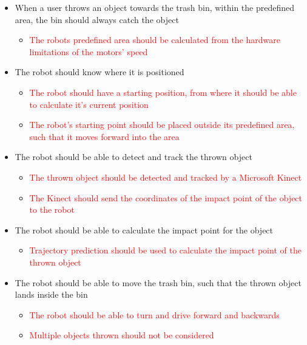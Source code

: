 \begin{itemize}
\item When a user throws an object towards the trash bin, within the predefined area, the bin should always catch the object
\begin{itemize}
\item \textcolor{red}{The robots predefined area should be calculated from the hardware limitations of the motors’ speed}
\end{itemize}
\item The robot should know where it is positioned
\begin{itemize}
\item \textcolor{red}{The robot should have a starting position, from where it should be able to calculate it's current position }
\item \textcolor{red}{The robot's starting point should be placed outside its predefined area, such that it moves forward into the area}
\end{itemize}
\item The robot should be able to detect and track the thrown object
\begin{itemize}
\item \textcolor{red}{The thrown object should be detected and tracked by a Microsoft Kinect}
\item \textcolor{red}{The Kinect should send the coordinates of the impact point of the object to the robot}
\end{itemize}
\item The robot should be able to calculate the impact point for the object
\begin{itemize}
\item \textcolor{red}{Trajectory prediction should be used to calculate the impact point of the thrown object}
\end{itemize}
\item The robot should be able to move the trash bin, such that the thrown object lands inside the bin
\begin{itemize}
\item \textcolor{red}{The robot should be able to turn and drive forward and backwards}
\item \textcolor{red}{Multiple objects thrown should not be considered}
\end{itemize}
\end{itemize}